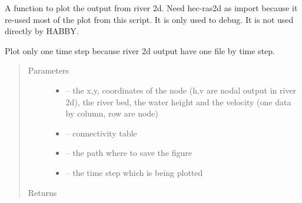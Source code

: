 \documentclass[letterpaper,10pt,english]{sphinxmanual}
\begin{document}
\begin{fulllineitems}
\label{\detokenize{index:src.river2d.figure_river2d}}
A function to plot the output from river 2d. Need hec-ras2d as import because it re-used most of the plot from this
script. It is only used to debug. It is not used directly by HABBY.

Plot only one time step because river 2d output have one file by time step.
\begin{quote}\begin{description}
\item[{Parameters}] \leavevmode\begin{itemize}
\item {} 
 -- the x,y, coordinates of the node (h,v are nodal output in river 2d), the river bed, the water height
and the velocity (one data by column, row are node)

\item {} 
 -- connectivity table

\item {} 
 -- the path where to save the figure

\item {} 
 -- the time step which is being plotted

\end{itemize}

\item[{Returns}] \leavevmode


\end{description}\end{quote}

\end{fulllineitems}

\end{document}
